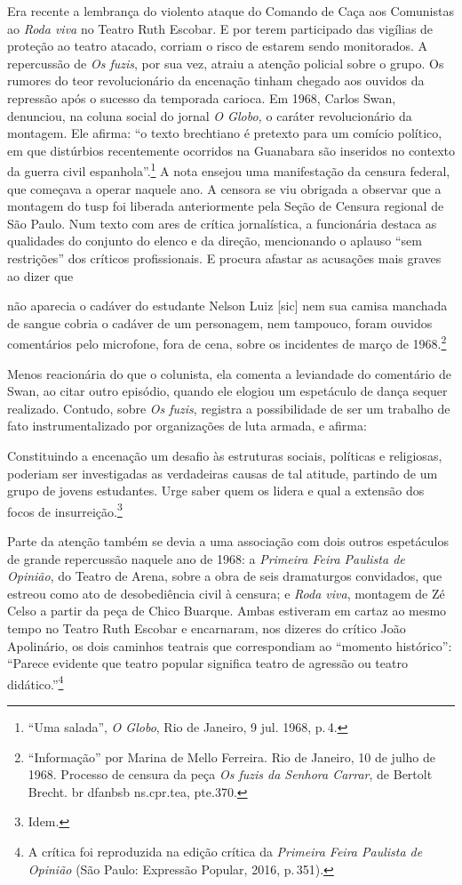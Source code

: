 Era recente a lembrança do violento ataque do Comando de Caça aos
Comunistas ao {\it Roda viva} no Teatro Ruth Escobar. E por terem
participado das vigílias de proteção ao teatro atacado, corriam o risco
de estarem sendo monitorados. A repercussão de {\it Os fuzis}, por sua
vez, atraiu a atenção policial sobre o grupo. Os rumores do teor
revolucionário da encenação tinham chegado aos ouvidos da repressão após
o sucesso da temporada carioca. Em 1968, Carlos Swan, denunciou, na
coluna social do jornal {\it O Globo,} o caráter revolucionário da
montagem. Ele afirma: “o texto brechtiano é pretexto para um comício
político, em que distúrbios recentemente ocorridos na Guanabara são
inseridos no contexto da guerra civil espanhola”.\footnote{“Uma salada”,
  {\it O Globo}, Rio de Janeiro, 9 jul. 1968, p.\,4.} A nota ensejou uma
manifestação da censura federal, que começava a operar naquele ano. A
censora se viu obrigada a observar que a montagem do {\sc tusp} foi liberada
anteriormente pela Seção de Censura regional de São Paulo. Num texto com
ares de crítica jornalística, a funcionária destaca as qualidades do
conjunto do elenco e da direção, mencionando o aplauso “sem restrições”
dos críticos profissionais. E procura afastar as acusações mais graves
ao dizer que

\startblockquote
não aparecia o cadáver do estudante Nelson Luiz {[}sic{]} nem sua camisa
manchada de sangue cobria o cadáver de um personagem, nem tampouco,
foram ouvidos comentários pelo microfone, fora de cena, sobre os
incidentes de março de 1968.\footnote{“Informação” por Marina de Mello
  Ferreira. Rio de Janeiro, 10 de julho de 1968. Processo de censura da
  peça {\it Os fuzis da Senhora Carrar}, de Bertolt Brecht. {\sc br dfanbsb
    ns.cpr.tea, pte.370}.}
\stopblockquote

Menos reacionária do que o colunista, ela comenta a leviandade do
comentário de Swan, ao citar outro episódio, quando ele elogiou um
espetáculo de dança sequer realizado. Contudo, sobre {\it Os fuzis},
registra a possibilidade de ser um trabalho de fato instrumentalizado
por organizações de luta armada, e afirma:

\startblockquote
Constituindo a encenação um desafio às estruturas sociais, políticas e
religiosas, poderiam ser investigadas as verdadeiras causas de tal
atitude, partindo de um grupo de jovens estudantes. Urge saber quem os
lidera e qual a extensão dos focos de insurreição.\footnote{Idem.}
\stopblockquote

Parte da atenção também se devia a uma associação com dois outros
espetáculos de grande repercussão naquele ano de 1968: a {\it Primeira
Feira Paulista de Opinião}, do Teatro de Arena, sobre a obra de seis
dramaturgos convidados, que estreou como ato de desobediência civil à
censura; e {\it Roda viva}, montagem de Zé Celso a partir da peça de
Chico Buarque. Ambas estiveram em cartaz ao mesmo tempo no Teatro Ruth
Escobar e encarnaram, nos dizeres do crítico João Apolinário, os dois
caminhos teatrais que correspondiam ao “momento histórico”: “Parece
evidente que teatro popular significa teatro de agressão ou teatro
didático.”\footnote{A crítica foi reproduzida na edição crítica da
  {\it Primeira Feira Paulista de Opinião} (São Paulo: Expressão
  Popular, 2016, p.\,351).}

